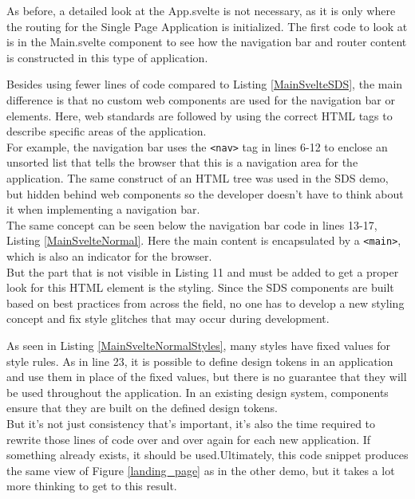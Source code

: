 As before, a detailed look at the App.svelte is not necessary, as it is only where the routing for the Single Page Application is initialized. The first code to look at is in the Main.svelte component to see how the navigation bar and router content is constructed in this type of application. 

Besides using fewer lines of code compared to Listing \ref{MainSvelteSDS}, the main difference is that no custom web components are used for the navigation bar or elements. Here, web standards are followed by using the correct \ac{HTML} tags to describe specific areas of the application. \\
For example, the navigation bar uses the \texttt{<nav>} tag in lines 6-12 to enclose an unsorted list that tells the browser that this is a navigation area for the application. The same construct of an \ac{HTML} tree was used in the \ac{SDS} demo, but hidden behind web components so the developer doesn't have to think about it when implementing a navigation bar. \\
The same concept can be seen below the navigation bar code in lines 13-17, Listing \ref{MainSvelteNormal}. Here the main content is encapsulated by a \texttt{<main>}, which is also an indicator for the browser. \\
But the part that is not visible in Listing 11 and must be added to get a proper look for this \ac{HTML} element is the styling. Since the SDS components are built based on best practices from across the field, no one has to develop a new styling concept and fix style glitches that may occur during development. 

As seen in Listing \ref{MainSvelteNormalStyles}, many styles have fixed values for style rules. As in line 23, it is possible to define design tokens in an application and use them in place of the fixed values, but there is no guarantee that they will be used throughout the application. In an existing design system, components ensure that they are built on the defined design tokens. \\
But it's not just consistency that's important, it's also the time required to rewrite those lines of code over and over again for each new application. If something already exists, it should be used.Ultimately, this code snippet produces the same view of Figure \ref{landing_page} as in the other demo, but it takes a lot more thinking to get to this result.  \\

